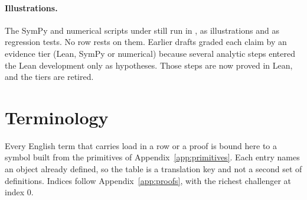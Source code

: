 \paragraph{Illustrations.} The SymPy and numerical scripts under
 still run in , as illustrations and as
regression tests. No row rests on them. Earlier drafts graded each claim by an
evidence tier (Lean, SymPy or numerical) because several analytic steps entered
the Lean development only as hypotheses. Those steps are now proved in Lean,
and the tiers are retired.

\section{Terminology}
\label{app:terminology}

Every English term that carries load in a row or a proof is bound here to a
symbol built from the primitives of Appendix~\ref{app:primitives}. Each entry
names an object already defined, so the table is a translation key and not a
second set of definitions. Indices follow Appendix~\ref{app:proofs}, with the
richest challenger at index $0$.

